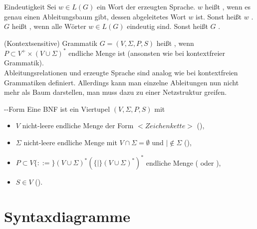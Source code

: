 \begin{Def}{Eindeutigkeit}
    Sei $w \in L(G)$ ein Wort der erzeugten Sprache.
    $w$ heißt , wenn es genau einen Ableitungsbaum gibt,
    dessen abgeleitetes Wort $w$ ist.
    Sonst heißt $w$ . \\
    $G$ heißt , wenn alle Wörter $w \in L(G)$ eindeutig
    sind.
    Sonst heißt $G$ .
\end{Def}

\begin{Def}{(Kontextsensitive) Grammatik}
    $G = (V, \Sigma, P, S)$ heißt , wenn \\
    $P \subset V^+ \times (V \cup \Sigma)^\ast$ endliche Menge ist
    (ansonsten wie bei kontextfreier Grammatik). \\
    Ableitungsrelationen und erzeugte Sprache sind analog wie bei
    kontextfreien Grammatiken definiert.
    Allerdings kann man einzelne Ableitungen nun nicht mehr als Baum
    darstellen, man muss dazu zu einer Netzstruktur greifen.
\end{Def}

\begin{Def}{--Form}
    Eine BNF ist ein Viertupel $(V, \Sigma, P, S)$ mit
    \begin{itemize}
        \item $V$ nicht-leere endliche Menge der Form
        $<\!\!Zeichenkette\!\!>$ (),

        \item $\Sigma$ nicht-leere endliche Menge mit
        $V \cap \Sigma = \emptyset$ und $| \notin \Sigma$
        (),

        \item $P \subset V \{::=\}
        (V \cup \Sigma)^\ast (\{|\} (V \cup \Sigma)^\ast)^\ast$
        endliche Menge ( oder ),

        \item $S \in V$ ().
    \end{itemize}
\end{Def}

\section{%
    Syntaxdiagramme%
}

